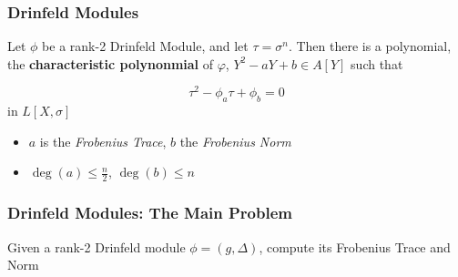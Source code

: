 \documentclass{beamer}
\newcommand{\f}{\mathbb{F}}
\begin{document}





\begin{frame}
\frametitle{Drinfeld Modules}

\begin{theorem}[Gekeler, 1991]
Let $\phi$ be a rank-2 Drinfeld Module, and let $\tau = \sigma^n$. Then there is a polynomial, the \textbf{characteristic polynonmial} of $\varphi$,  $Y^2 - aY +b \in A[Y]$ such that

\[\tau^2 -\phi_a\tau + \phi_b = 0\]
in $L[X,\sigma]$
\end{theorem}

\begin{itemize}
    \item $a$ is the \textit{Frobenius Trace}, $b$ the \textit{Frobenius Norm}
    \item $\deg(a) \leq \frac{n}{2}$, $\deg(b) \leq n$
\end{itemize}

\end{frame}


\begin{frame}
\frametitle{Drinfeld Modules: The Main Problem}

\begin{problem}
Given a rank-2 Drinfeld module $\phi = (g,\Delta)$, compute its Frobenius Trace and Norm
\end{problem}

\end{frame}




\end{document}

